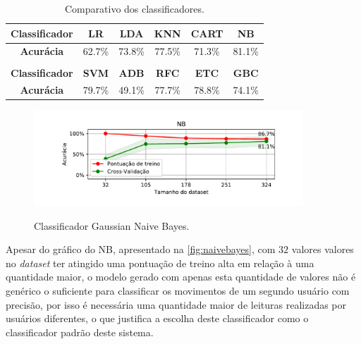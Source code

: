 \begin{table}[ht]
    \centering
    \caption{Comparativo dos classificadores.}
    \begin{tabular}{cccccc}
        \hline
        \multicolumn{1}{|c|}{\textbf{Classificador}} & \multicolumn{1}{c|}{\textbf{LR}} & \multicolumn{1}{c|}{\textbf{LDA}} & \multicolumn{1}{c|}{\textbf{KNN}} & \multicolumn{1}{c|}{\textbf{CART}} & \multicolumn{1}{c|}{\textbf{NB}} \\ \hline
        \multicolumn{1}{|c|}{\textbf{Acurácia}} & \multicolumn{1}{c|}{62.7\%} & \multicolumn{1}{c|}{73.8\%} & \multicolumn{1}{c|}{77.5\%} & \multicolumn{1}{c|}{71.3\%} & \multicolumn{1}{c|}{81.1\%} \\ \hline
        \multicolumn{1}{l}{} & \multicolumn{1}{l}{} & \multicolumn{1}{l}{} & \multicolumn{1}{l}{} & \multicolumn{1}{l}{} & \multicolumn{1}{l}{} \\ \hline
        \multicolumn{1}{|l|}{\textbf{Classificador}} & \multicolumn{1}{c|}{\textbf{SVM}} & \multicolumn{1}{c|}{\textbf{ADB}} & \multicolumn{1}{c|}{\textbf{RFC}} & \multicolumn{1}{c|}{\textbf{ETC}} & \multicolumn{1}{c|}{\textbf{GBC}} \\ \hline
        \multicolumn{1}{|c|}{\textbf{Acurácia}} & \multicolumn{1}{c|}{79.7\%} & \multicolumn{1}{c|}{49.1\%} & \multicolumn{1}{c|}{77.7\%} & \multicolumn{1}{c|}{78.8\%} & \multicolumn{1}{c|}{74.1\%} \\ \hline
    \end{tabular}
    \label{tab:comparativo}
\end{table}

\begin{figure}[ht]
    \centering
    \caption{Classificador Gaussian Naive Bayes.}
    \includegraphics[width=0.9\textwidth, keepaspectratio]{resources/comparacao.pdf}
    \label{fig:naivebayes}
\end{figure}

Apesar do gráfico do NB, apresentado na \autoref{fig:naivebayes}, com $32$ valores valores no \textit{dataset} ter atingido uma pontuação de treino alta em relação à uma quantidade maior, o modelo gerado com apenas esta quantidade de valores não é genérico o suficiente para classificar os movimentos de um segundo usuário com precisão, por isso é necessária uma quantidade maior de leituras realizadas por usuários diferentes, o que justifica a escolha deste classificador como o classificador padrão deste sistema.

